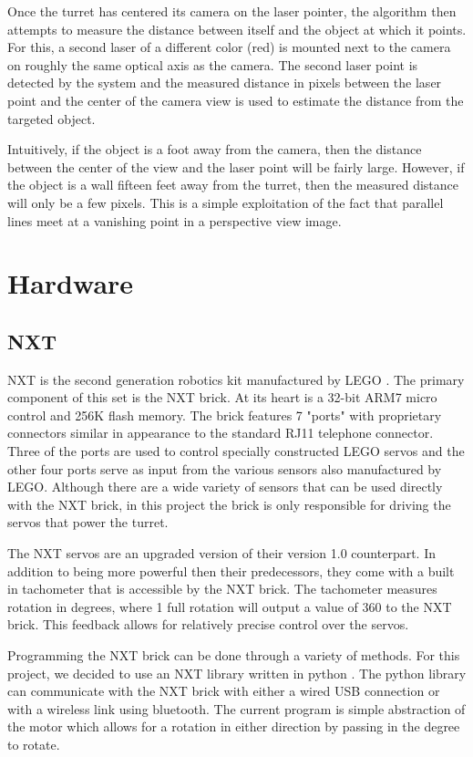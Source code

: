 \documentclass[10pt,twocolumn,letterpaper]{article}
\begin{document}
Once the turret has centered its camera on the laser pointer, the algorithm then attempts to measure the distance between itself and the object at which it points.  For this, a second laser of a different color (red) is mounted next to the camera on roughly the same optical axis as the camera.  The second laser point is detected by the system and the measured distance in pixels between the laser point and the center of the camera view is used to estimate the distance from the targeted object.

Intuitively, if the object is a foot away from the camera, then the distance between the center of the view and the laser point will be fairly large.  However, if the object is a wall fifteen feet away from the turret, then the measured distance will only be a few pixels.  This is a simple exploitation of the fact that parallel lines meet at a vanishing point in a perspective view image. 

\section{Hardware}

\subsection{NXT}

NXT is the second generation robotics kit manufactured by LEGO \cite{nxt}. The primary component of this set is the NXT brick. At its heart is a 32-bit ARM7 micro control and 256K flash memory. The brick features 7 "ports" with proprietary connectors similar in appearance to the standard RJ11 telephone connector. Three of the ports are used to control specially constructed LEGO servos and the other four ports serve as input from the various sensors also manufactured by LEGO. Although there are a wide variety of sensors that can be used directly with the NXT brick, in this project the brick is only responsible for driving the servos that power the turret.

The NXT servos are an upgraded version of their version 1.0 counterpart. In addition to being more powerful then their predecessors, they come with a built in tachometer that is accessible by the NXT brick. The tachometer measures rotation in degrees, where 1 full rotation will output a value of 360 to the NXT brick. This feedback allows for relatively precise control over the servos.

Programming the NXT brick can be done through a variety of methods. For this project, we decided to use an NXT library written in python \cite{pynxt}. The python library can communicate with the NXT brick with either a wired USB connection or with a wireless link using bluetooth. The current program is simple abstraction of the motor which allows for a rotation in either direction by passing in the degree to rotate.
\end{document}
